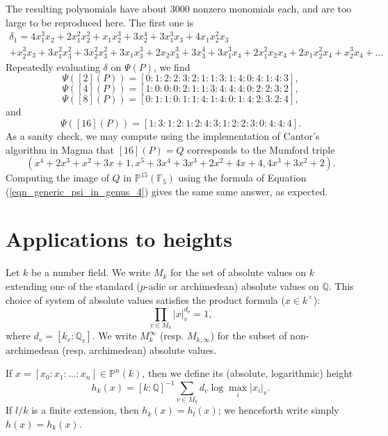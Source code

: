 \documentclass{article} %
\numberwithin{equation}{section}
\renewcommand{\P}{\mathbb{P}}
\newcommand{\Q}{\mathbb{Q}}
\newcommand{\F}{\mathbb{F}}
\begin{document}
The resulting polynomials have about 3000 nonzero monomials each, and are too large to be reproduced here. The first one is
\begin{multline*} \delta_1 = 4 x_1^3 x_2+2 x_1^2 x_2^2+x_1 x_2^3+3 x_2^4+3 x_1^3 x_3+4 x_1 x_2^2 x_3\\+x_2^3 x_3+3 x_1^2 x_3^2+3 x_2^2 x_3^2+3 x_1 x_3^3+2 x_2 x_3^3+3 x_3^4+3 x_1^3 x_4+2 x_1^2 x_2 x_4+2 x_1 x_2^2 x_4+x_2^3 x_4+ \dots 
\end{multline*} 
Repeatedly evaluating $\delta$ on $\Psi(P)$, we find
\[ \Psi([2](P)) = [0:1:2:2:3:2:1:1:3:1:4:0:4:1:4:3], \]
\[ \Psi([4](P)) = [1:0:0:0:2:1:1:3:4:4:4:0:2:2:3:2], \]
\[ \Psi([8](P)) = [0:1:1:0:1:1:4:1:4:0:1:4:2:3:2:4],\]
and
\[ \Psi([16](P)) = [1:3:1:2:1:2:4:3:1:2:2:3:0:4:4:4]. \]
As a sanity check, we may compute using the implementation of Cantor's algorithm in Magma \cite{Mag97} that $[16](P) = Q$ corresponds to the Mumford triple 
\[ (x^4 + 2 x^3 + x^2 + 3x + 1, x^5+3x^4+3x^3+2x^2+4x+4, 4 x^3 + 3 x^2 + 2). \]
Computing the image of $Q$ in $\P^{15}(\F_5)$ using the formula of Equation (\ref{eqn_generic_psi_in_genus_4}) gives the same same answer, as expected. 

\section{Applications to heights}\label{sec_applications_to_heights}

Let $k$ be a number field. We write $M_k$ for the set of absolute values on $k$ extending one of the standard ($p$-adic or archimedean) absolute values on $\Q$. This choice of system of absolute values satisfies the product formula ($x \in k^\times$):
\[ \prod_{v \in M_k} |x|_v^{d_v} = 1, \]
where $d_v = [k_v : \Q_v]$. 
We write $M_k^\infty$ (resp. $M_{k, \infty}$) for the subset of non-archimedean (resp. archimedean) absolute values.

If $x = [x_0 : x_1 : \dots : x_n] \in \P^n(k)$, then we define its (absolute, logarithmic) height
\[ h_k(x) = [k : \Q]^{-1} \sum_{v \in M_k} d_v \log \max_i |x_i|_v. \]
If $l / k$ is a finite extension, then $h_k(x) = h_l(x)$; we henceforth write simply $h(x) = h_k(x)$. 
\end{document}
